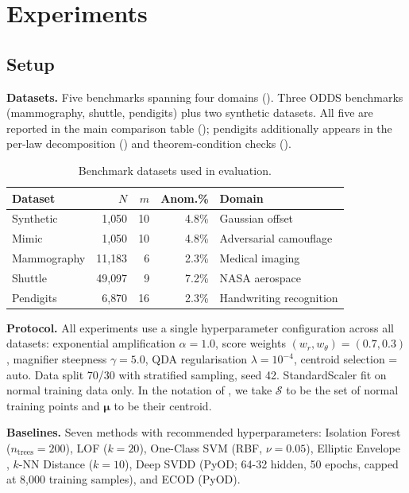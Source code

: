 \documentclass{article}
\newcommand{\Nset}{\mathcal{S}}  %
\begin{document}
\section{Experiments}
\label{sec:experiments}

\subsection{Setup}

\textbf{Datasets.} Five benchmarks spanning four domains (). Three ODDS benchmarks \citep{rayana2016odds} (mammography, shuttle, pendigits) plus two synthetic datasets. All five are reported in the main comparison table (); pendigits additionally appears in the per-law decomposition () and theorem-condition checks ().

\begin{table}[t]
\centering
\caption{Benchmark datasets used in evaluation.}
\label{tab:datasets}
\begin{tabular}{@{}lrrrl@{}}
\toprule
\textbf{Dataset} & $N$ & $m$ & \textbf{Anom.\%} & \textbf{Domain} \\
\midrule
Synthetic & 1{,}050 & 10 & 4.8\% & Gaussian offset \\
Mimic & 1{,}050 & 10 & 4.8\% & Adversarial camouflage \\
Mammography & 11{,}183 & 6 & 2.3\% & Medical imaging \\
Shuttle & 49{,}097 & 9 & 7.2\% & NASA aerospace \\
Pendigits & 6{,}870 & 16 & 2.3\% & Handwriting recognition \\
\bottomrule
\end{tabular}
\end{table}

\textbf{Protocol.} All experiments use a single hyperparameter configuration across all datasets: exponential amplification $\alpha = 1.0$, score weights $(w_r, w_\theta) = (0.7, 0.3)$, magnifier steepness $\gamma = 5.0$, QDA regularisation $\lambda = 10^{-4}$, centroid selection = auto. Data split 70/30 with stratified sampling, seed 42. StandardScaler fit on normal training data only. In the notation of , we take $\Nset$ to be the set of normal training points and $\bm{\mu}$ to be their centroid.

\textbf{Baselines.} Seven methods with recommended hyperparameters: Isolation Forest \citep{liu2008isolation} ($n_{\text{trees}} = 200$), LOF \citep{breunig2000lof} ($k=20$), One-Class SVM \citep{scholkopf2001estimating} (RBF, $\nu=0.05$), Elliptic Envelope \citep{rousseeuw1999fast}, $k$-NN Distance \citep{ramaswamy2000efficient} ($k=10$), Deep SVDD \citep{ruff2018deep} (PyOD; 64-32 hidden, 50 epochs, capped at 8{,}000 training samples), and ECOD \citep{li2022ecod} (PyOD).
\end{document}
